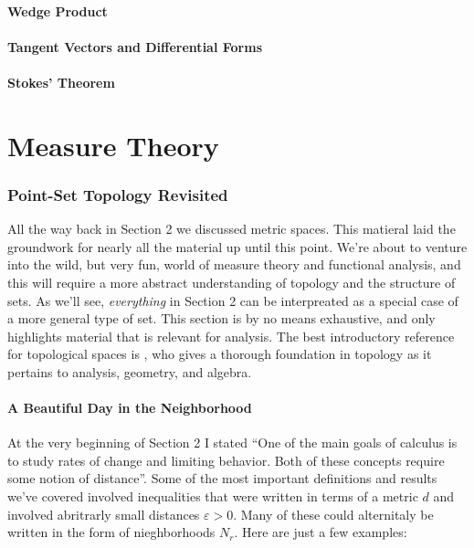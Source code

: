 \documentclass{article}
\theoremstyle{definition}
\begin{document}
	\subsection{Wedge Product}
	\subsection{Tangent Vectors and Differential Forms}
	\subsection{Stokes' Theorem}
	
	\newpage
	\part{Measure Theory}
	
	\section{Point-Set Topology Revisited}
	All the way back in Section 2 we discussed metric spaces. This matieral laid the groundwork for nearly all the material up until this point. We're about to venture into the wild, but very fun, world of measure theory and functional analysis, and this will require a more abstract understanding of topology and the structure of sets. As we'll see, \textit{everything} in Section 2 can be interpreated as a special case of a more general type of set. This section is by no means exhaustive, and only highlights material that is relevant for analysis. The best introductory reference for topological spaces is \cite{munk2}, who gives a thorough foundation in topology as it pertains to analysis, geometry, and algebra.
	\subsection{A Beautiful Day in the Neighborhood}
	
	At the very beginning of Section 2 I stated ``One of the main goals of calculus is to study rates of change and limiting behavior. Both of these concepts require some notion of distance''. Some of the most important definitions and results we've covered involved inequalities that were written in terms of a metric $d$ and involved abritrarly small distances $\varepsilon > 0$. Many of these could alternitaly be written in the form of nieghborhoods $N_r$. Here are just a few examples: 
	
\end{document}
